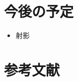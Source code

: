 \documentclass[report]{jlreq}
\begin{document}
%
\section*{今後の予定}

\begin{itemize}
    \item 射影
\end{itemize}

%
\section*{参考文献}


\nocite{amari_information_2016}
\nocite{amari_methods_2007}
\nocite{ay_information_2017}

{
    \renewcommand{\bibsection}{}
    
    
}

%
\end{document}
